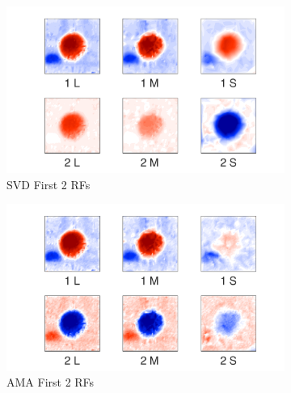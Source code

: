 \documentclass{jov}
\begin{document}
\begin{figure}
\centering
\begin{subfigure}[b]{0.27 \textwidth}
		\centering
        \includegraphics[width=\textwidth]{../Figures/Figure10/Figure10_a.pdf}
        \caption{SVD First 2 RFs}
        \label{fig:case9SVD}
    \end{subfigure}
    \begin{subfigure}[b]{0.27 \textwidth}   
        \includegraphics[width=\textwidth]{../Figures/Figure10/Figure10_b.pdf}
        \caption{AMA First 2 RFs}
        \label{fig:case9AMA}
    \end{subfigure}
        \begin{subfigure}[b]{0.20 \textwidth}

\end{subfigure}
\end{figure}
\end{document}
